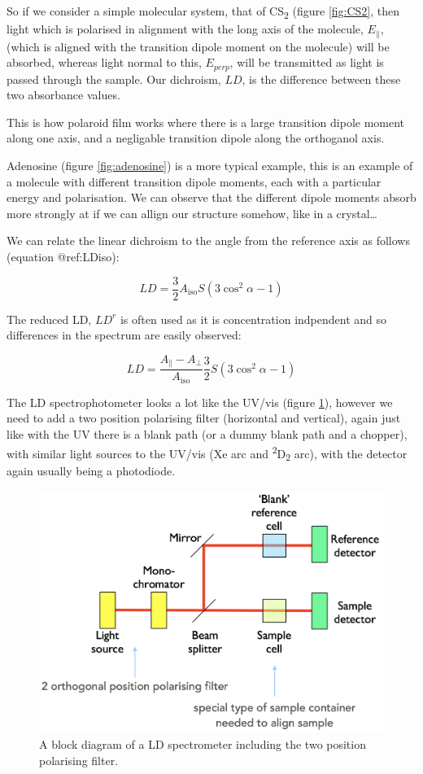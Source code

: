 \documentclass[
]{book}
\begin{document}
So if we consider a simple molecular system, that of CS\textsubscript{2} (figure \ref{fig:CS2}, then light which is polarised in alignment with the long axis of the molecule, \(E_{\parallel}\), (which is aligned with the transition dipole moment on the molecule) will be absorbed, whereas light normal to this, \(E_{perp}\), will be transmitted as light is passed through the sample. Our dichroism, \(LD\), is the difference between these two absorbance values.

This is how polaroid film works where there is a large transition dipole moment along one axis, and a negligable transition dipole along the orthoganol axis.

Adenosine (figure \ref{fig:adenosine}) is a more typical example, this is an example of a molecule with different transition dipole moments, each with a particular energy and polarisation. We can observe that the different dipole moments absorb more strongly at if we can allign our structure somehow, like in a crystal\ldots{}

We can relate the linear dichroism to the angle from the reference axis as follows (equation @ref:LDiso):

\begin{equation}
LD = \frac{3}{2}A_{\textrm{iso}}S(3 \cos^2 \alpha - 1)
\label{eq:LDiso}
\end{equation}

The reduced LD, \(LD^r\) is often used as it is concentration indpendent and so differences in the spectrum are easily observed:

\begin{equation}
LD = \frac{A_{\parallel} - A_{\perp}}{A_\textrm{iso}} \frac{3}{2}S(3 \cos^2 \alpha - 1)
\label{eq:LDred}
\end{equation}

The LD spectrophotometer looks a lot like the UV/vis (figure \ref{fig:LDspec}), however we need to add a two position polarising filter (horizontal and vertical), again just like with the UV there is a blank path (or a dummy blank path and a chopper), with similar light sources to the UV/vis (Xe arc and \textsuperscript{2}D\textsubscript{2} arc), with the detector again usually being a photodiode.

\begin{figure}

{\centering \includegraphics[width=0.6\linewidth]{images/LDspec} 

}

\caption{A block diagram of a LD spectrometer including the two position polarising filter.}\label{fig:LDspec}
\end{figure}
\end{document}
